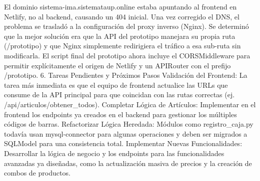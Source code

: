 El dominio sistema-ima.sistemataup.online estaba apuntando al frontend en Netlify, no al backend, causando un 404 inicial.
Una vez corregido el DNS, el problema se trasladó a la configuración del proxy inverso (Nginx).
Se determinó que la mejor solución era que la API del prototipo manejara su propia ruta (/prototipo) y que Nginx simplemente redirigiera el tráfico a esa sub-ruta sin modificarla.
El script final del prototipo ahora incluye el CORSMiddleware para permitir explícitamente el origen de Netlify y un APIRouter con el prefijo /prototipo.
6. Tareas Pendientes y Próximos Pasos
Validación del Frontend: La tarea más inmediata es que el equipo de frontend actualice las URLs que consume de la API principal para que coincidan con las rutas correctas (ej. /api/articulos/obtener_todos).
Completar Lógica de Artículos: Implementar en el frontend los endpoints ya creados en el backend para gestionar los múltiples códigos de barras.
Refactorizar Lógica Heredada: Módulos como registro_caja.py todavía usan mysql-connector para algunas operaciones y deben ser migrados a SQLModel para una consistencia total.
Implementar Nuevas Funcionalidades: Desarrollar la lógica de negocio y los endpoints para las funcionalidades avanzadas ya diseñadas, como la actualización masiva de precios y la creación de combos de productos.